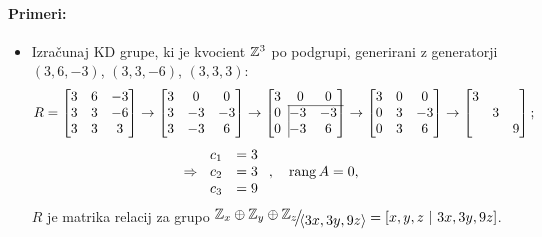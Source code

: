 \paragraph{Primeri:}
\begin{itemize}
	\item{Izra\v cunaj KD grupe, ki je kvocient $\mathbb{Z}^3$ po podgrupi, generirani z generatorji $(3,6,-3)$, $(3,3,-6)$, $(3,3,3)$:
		\[
			R = \begin{bmatrix}
				3 & 6 & -3 \\
				3 & 3 & -6 \\
				3 & 3 & 3
			\end{bmatrix} \to \begin{bmatrix}
				3 & 0  & 0  \\
				3 & -3 & -3 \\
				3 & -3 & 6
			\end{bmatrix} \to \begin{bmatrix}
				3 & 0 & 0 \\
				\cline{2-3}
				0 &\hspace{-1ex}\vline -3 & -3 \\
				0 &\hspace{-1ex}\vline -3 & 6
			\end{bmatrix} \to \begin{bmatrix}
				3 & 0 & 0 \\
				0 & 3 & -3\\
				0 & 3 & 6
			\end{bmatrix} \to \begin{bmatrix}
				3 &   & \\
				  & 3 & \\
				  &   & 9
			\end{bmatrix};
		\]
		\[
			\Rightarrow
			\left.
			\begin{array}{rl}
				c_1 &= 3\\
				c_2 &= 3\\
				c_3 &= 9
			\end{array}\right.,\quad \operatorname{rang} A = 0,
		\]
		$R$ je matrika relacij za grupo $\quot{\Z_x \oplus \Z_y \oplus \Z_z}{\langle3x, 3y, 9z \rangle} =
		[x,y,z\ |\ 3x, 3y, 9z]$.
	}
\end{itemize}
